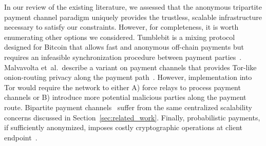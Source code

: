 In our review of the existing literature, we assessed that the anonymous
tripartite payment channel paradigm uniquely provides the trustless, scalable
infrastructure necessary to satisfy our constraints. However, for completeness,
it is worth enumerating other options we considered. Tumblebit is a mixing
protocol designed for Bitcoin that allows fast and anonymous off-chain payments
but requires an infeasible synchronization procedure between payment
parties~\cite{heilman2017tumblebit}. Malvavolta et\ al.\ describe a variant on
payment channels that provides Tor-like onion-routing privacy along the payment
path~\cite{malavolta2017concurrency}. However, implementation into Tor would
require the network to either A) force relays to process payment channels or B)
introduce more potential malicious parties along the payment route. Bipartite
payment channels~\cite{zhang2019z} suffer from the same centralized scalability
concerns discussed in Section~\ref{sec:related_work}. Finally, probabilistic
payments, if sufficiently anonymized, imposes costly cryptographic operations at
client endpoint~\cite{chiesa2017decentralized}.

